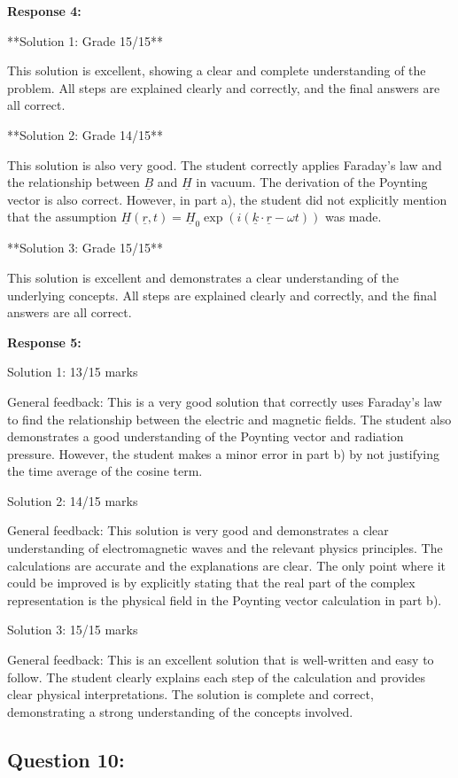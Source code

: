 \documentclass[a4paper,11pt]{article}
\begin{document}
\textbf{Response 4:}

**Solution 1: Grade 15/15**

This solution is excellent, showing a clear and complete understanding of the problem. All steps are explained clearly and correctly, and the final answers are all correct.

**Solution 2: Grade 14/15**

This solution is also very good. The student correctly applies Faraday's law and the relationship between \(\underline{B}\) and \(\underline{H}\) in vacuum. The derivation of the Poynting vector is also correct. However, in part a), the student did not explicitly mention that the assumption \( \underline{H}(\underline{r}, t) = \underline{H}_0 \exp (i(\underline{k} \cdot \underline{r} - \omega t)) \) was made.

**Solution 3: Grade 15/15**

This solution is excellent and demonstrates a clear understanding of the underlying concepts. All steps are explained clearly and correctly, and the final answers are all correct.

\textbf{Response 5:}

Solution 1: 13/15 marks

General feedback: This is a very good solution that correctly uses Faraday's law to find the relationship between the electric and magnetic fields. The student also demonstrates a good understanding of the Poynting vector and radiation pressure. However, the student makes a minor error in part b) by not justifying the time average of the cosine term.

Solution 2: 14/15 marks

General feedback: This solution is very good and demonstrates a clear understanding of electromagnetic waves and the relevant physics principles. The calculations are accurate and the explanations are clear. The only point where it could be improved is by explicitly stating that the real part of the complex representation is the physical field in the Poynting vector calculation in part b).

Solution 3: 15/15 marks

General feedback: This is an excellent solution that is well-written and easy to follow. The student clearly explains each step of the calculation and provides clear physical interpretations. The solution is complete and correct, demonstrating a strong understanding of the concepts involved.

\subsection*{Question 10:}
\end{document}
